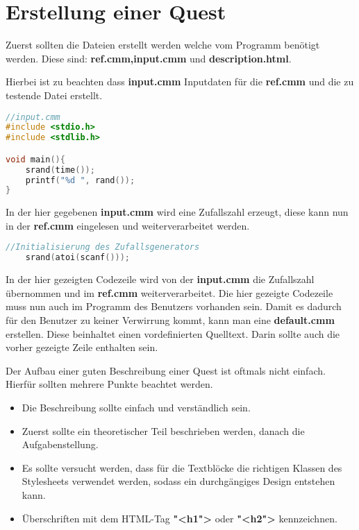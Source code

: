 \section{Erstellung einer Quest}
Zuerst sollten die Dateien erstellt werden welche vom Programm benötigt werden. Diese sind: \textbf{ref.cmm,input.cmm} und \textbf{description.html}.

Hierbei ist zu beachten dass \textbf{input.cmm} Inputdaten für die \textbf{ref.cmm} und die zu testende Datei erstellt.
\begin{lstlisting}[language=C]
//input.cmm
#include <stdio.h>
#include <stdlib.h>

void main(){
	srand(time());
	printf("%d ", rand());	
}

\end{lstlisting}
In der hier gegebenen \textbf{input.cmm} wird eine Zufallszahl erzeugt, diese kann nun in der \textbf{ref.cmm} eingelesen und weiterverarbeitet werden. 
\begin{lstlisting}[language=C]
	//Initialisierung des Zufallsgenerators
	srand(atoi(scanf()));
\end{lstlisting}
In der hier gezeigten Codezeile wird von der \textbf{input.cmm} die Zufallszahl übernommen und im \textbf{ref.cmm} weiterverarbeitet. Die hier gezeigte Codezeile muss nun auch im Programm des Benutzers vorhanden sein. Damit es dadurch für den Benutzer zu keiner Verwirrung kommt, kann man eine \textbf{default.cmm} erstellen. Diese beinhaltet einen vordefinierten Quelltext. Darin sollte auch die vorher gezeigte Zeile enthalten sein.

Der Aufbau einer guten Beschreibung einer Quest ist oftmals nicht einfach. Hierfür sollten mehrere Punkte beachtet werden. 

\begin{itemize}
\item Die Beschreibung sollte einfach und verständlich sein. 
\item Zuerst sollte ein theoretischer Teil beschrieben werden, danach die Aufgabenstellung.
\item Es sollte versucht werden, dass für die Textblöcke die richtigen Klassen des Stylesheets verwendet werden, sodass ein durchgängiges Design entstehen kann.
\item Überschriften mit dem HTML-Tag \textbf{"<h1">} oder \textbf{"<h2">} kennzeichnen.
\end{itemize}